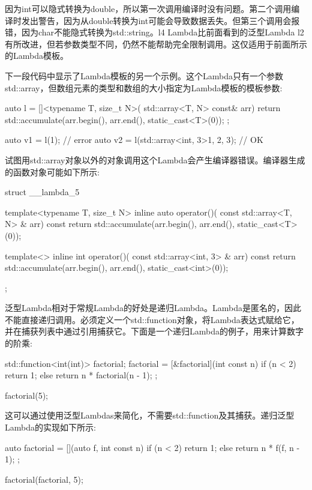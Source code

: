 因为int可以隐式转换为double，所以第一次调用编译时没有问题。第二个调用编译时发出警告，因为从double转换为int可能会导致数据丢失。但第三个调用会报错，因为char不能隐式转换为std::string。l4 Lambda比前面看到的泛型Lambda l2有所改进，但若参数类型不同，仍然不能帮助完全限制调用。这仅适用于前面所示的Lambda模板。

下一段代码中显示了Lambda模板的另一个示例。这个Lambda只有一个参数std::array，但数组元素的类型和数组的大小指定为Lambda模板的模板参数:

\begin{cpp}
auto l = []<typename T, size_t N>(
            std::array<T, N> const& arr)
{
	return std::accumulate(arr.begin(), arr.end(),
	                       static_cast<T>(0));
};

auto v1 = l(1); // error
auto v2 = l(std::array<int, 3>{1, 2, 3}); // OK
\end{cpp}

试图用std::array对象以外的对象调用这个Lambda会产生编译器错误。编译器生成的函数对象可能如下所示:

\begin{cpp}
struct __lambda_5
{
	template<typename T, size_t N>
	inline auto operator()(
		const std::array<T, N> & arr) const
	{
		return std::accumulate(arr.begin(), arr.end(),
							   static_cast<T>(0));
	}

	template<>
	inline int operator()(
		const std::array<int, 3> & arr) const
	{
		return std::accumulate(arr.begin(), arr.end(),
							   static_cast<int>(0));
	}
};
\end{cpp}

泛型Lambda相对于常规Lambda的好处是递归Lambda。Lambda是匿名的，因此不能直接递归调用。必须定义一个std::function对象，将Lambda表达式赋给它，并在捕获列表中通过引用捕获它。下面是一个递归Lambda的例子，用来计算数字的阶乘:

\begin{cpp}
std::function<int(int)> factorial;
factorial = [&factorial](int const n) {
	if (n < 2) return 1;
	else return n * factorial(n - 1);
};

factorial(5);
\end{cpp}

这可以通过使用泛型Lambdas来简化，不需要std::function及其捕获。递归泛型Lambda的实现如下所示:

\begin{cpp}
auto factorial = [](auto f, int const n) {
	if (n < 2) return 1;
	else return n * f(f, n - 1);
};

factorial(factorial, 5);
\end{cpp}

